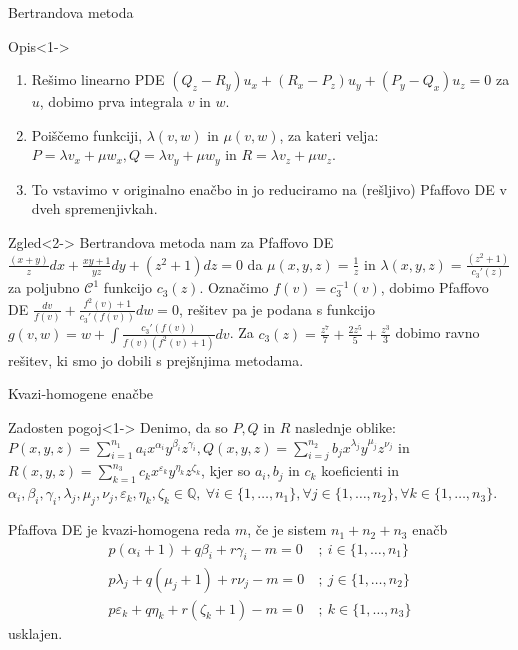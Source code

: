 \documentclass[t, 8pt]{beamer} %
\newcommand{\mth}[1]{\ensuremath{\mathbb{#1}}}
\newcommand{\Q}{\mth{Q}}
\newcommand{\fillblack}[1]{
	\begin{tikzpicture}[remember picture, overlay]
		\node [shift={(0 cm,0cm)}]  at (current page.south west)
		{%
			\begin{tikzpicture}[remember picture, overlay] at (current page.south west)
				\draw [fill=black] (0, 0) -- (0,#1 \paperheight) --
				(\paperwidth,#1 \paperheight) -- (\paperwidth,0) -- cycle ;
			\end{tikzpicture}
		};
		\draw (current page.north west) rectangle (current page.south east);
	\end{tikzpicture}
}
\begin{document}
		\begin{frame}{Bertrandova metoda}
			\begin{block}{Opis}<1->
				\begin{enumerate}
					\item Rešimo linearno PDE $(Q_z - R_y)u_x + (R_x - P_z)u_y + (P_y - Q_x)u_z = 0$ za $u$, dobimo prva integrala $v$ in $w$.
					\item Poiščemo funkciji, $\lambda(v, w)$ in $\mu(v, w)$, za kateri velja: 
						$P = \lambda v_x + \mu w_x, Q = \lambda v_y + \mu w_y$ in $R = \lambda v_z + \mu w_z$.
					\item To vstavimo v originalno enačbo in jo reduciramo na (rešljivo) Pfaffovo DE v dveh spremenjivkah.
				\end{enumerate}
			\end{block}
			\begin{block}{Zgled}<2->
				Bertrandova metoda nam za Pfaffovo DE $\frac{(x+y)}{z}dx + \frac{xy+1}{yz}dy + (z^2 + 1)dz = 0$ da $\mu(x, y, z) = \frac{1}{z}$ in $\lambda(x, y, z) = \frac{(z^2 +1)}{c_3'(z)}$ za poljubno $\mathcal{C}^1$ funkcijo $c_3(z)$. Označimo $f(v) = c_3^{-1}(v)$, dobimo Pfaffovo DE $\frac{dv}{f(v)} + \frac{f^2(v)+1}{c_3'(f(v))}dw = 0$, rešitev pa je podana s funkcijo $g(v, w) = w + \int \frac{c_3'(f(v))}{f(v)(f^2(v) + 1)}dv$. Za $c_3(z) = \frac{z^7}{7} + \frac{2z^5}{5} + \frac{z^3}{3}$ dobimo ravno rešitev, ki smo jo dobili s prejšnjima metodama.
			\end{block}
		\end{frame}
		
		\begin{frame}{Kvazi-homogene enačbe}
			\begin{block}{Zadosten pogoj}<1->
				Denimo, da so $P, Q$ in $R$ naslednje oblike: 
					$P(x, y, z) = \sum_{i = 1}^{n_1}a_ix^{\alpha_i}y^{\beta_i}z^{\gamma_i},
					Q(x, y, z) = \sum_{i = j}^{n_2}b_jx^{\lambda_j}y^{\mu_j}z^{\nu_j}$ in
					$R(x, y, z) = \sum_{k = 1}^{n_3}c_kx^{\varepsilon_k}y^{\eta_k}z^{\zeta_k}$, kjer so $a_i, b_j$ in $c_k$ koeficienti in $\alpha_i, \beta_i, \gamma_i, \lambda_j, \mu_j, \nu_j, \varepsilon_k, \eta_k, \zeta_k\in \Q,~ \forall i\in \{1,\ldots, n_1\}, \forall j\in \{1,\ldots, n_2\}, \forall k\in \{1,\ldots, n_3\}$.
				
				Pfaffova DE je kvazi-homogena reda $m$, če je sistem $n_1 + n_2 + n_3$ enačb \begin{align*}
					p(\alpha_i+1) + q\beta_i + r\gamma_i - m = 0~&;~ i\in \{1, \ldots, n_1\} \\
					p\lambda_j + q(\mu_j+1) + r\nu_j - m= 0~&;~ j\in \{1, \ldots, n_2\} \\
					p\varepsilon_k + q\eta_k + r(\zeta_k+1) - m=0~&;~ k\in \{1, \ldots, n_3\}
				\end{align*} usklajen.
			\end{block}
		\end{frame}
		
\end{document}
